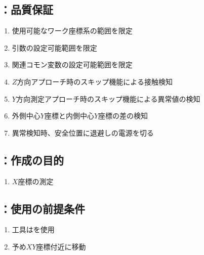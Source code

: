 \subsection{\MXIWidth：品質保証}
\begin{enumerate}[label*=\sarrow]
\item 使用可能なワーク座標系の範囲を限定
\item {}引数の設定可能範囲を限定
\item 関連コモン変数の設定可能範囲を限定
\item $Z$方向アプローチ時のスキップ機能による接触検知
\item $Y$方向測定アプローチ時のスキップ機能による異常値の検知
\item 外側中心$Y$座標と内側中心$Y$座標の差の検知
\item 異常検知時、安全位置に退避し\TouchSensorProbe の電源を切る
\end{enumerate}



\clearpage


\subsection{\MXIface：作成の目的}
\begin{enumerate}[label*=\sarrow]
\item \OutcutCenter $X$座標の測定
\end{enumerate}


\subsection{\MXIface：使用の前提条件}
\begin{enumerate}[label*=\sarrow]
\item 工具は\TouchSensorProbe を使用
\item 予め\OutcutCenter$XY$座標付近に移動
\end{enumerate}


